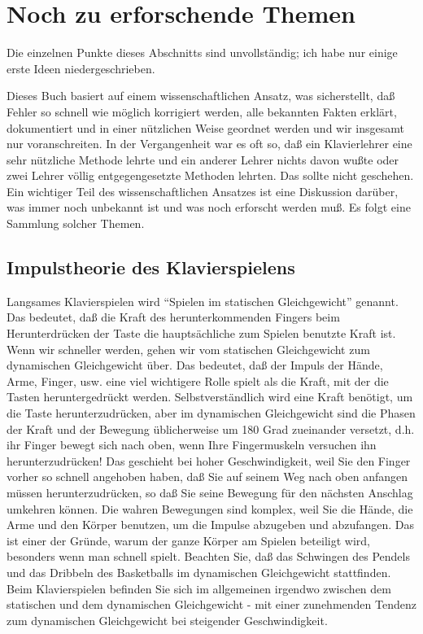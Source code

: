 
\section{Noch zu erforschende Themen}\hypertarget{c1iv6}{}

Die einzelnen Punkte dieses Abschnitts sind unvollständig; ich habe nur einige erste Ideen niedergeschrieben.

Dieses Buch basiert auf einem wissenschaftlichen Ansatz, was sicherstellt, daß Fehler so schnell wie möglich korrigiert werden, alle bekannten Fakten erklärt, dokumentiert und in einer nützlichen Weise geordnet werden und wir insgesamt nur voranschreiten.
In der Vergangenheit war es oft so, daß ein Klavierlehrer eine sehr nützliche Methode lehrte und ein anderer Lehrer nichts davon wußte oder zwei Lehrer völlig entgegengesetzte Methoden lehrten.
Das sollte nicht geschehen.
Ein wichtiger Teil des wissenschaftlichen Ansatzes ist eine Diskussion darüber, was immer noch unbekannt ist und was noch erforscht werden muß.
Es folgt eine Sammlung solcher Themen.


\subsection{Impulstheorie des Klavierspielens}\hypertarget{c1iv6a}{}

Langsames Klavierspielen wird \enquote{Spielen im statischen Gleichgewicht} genannt.
Das bedeutet, daß die Kraft des herunterkommenden Fingers beim Herunterdrücken der Taste die hauptsächliche zum Spielen benutzte Kraft ist.
Wenn wir schneller werden, gehen wir vom statischen Gleichgewicht zum dynamischen Gleichgewicht über.
Das bedeutet, daß der Impuls der Hände, Arme, Finger, usw. eine viel wichtigere Rolle spielt als die Kraft, mit der die Tasten heruntergedrückt werden.
Selbstverständlich wird eine Kraft benötigt, um die Taste herunterzudrücken, aber im dynamischen Gleichgewicht sind die Phasen der Kraft und der Bewegung üblicherweise um 180  Grad zueinander versetzt, d.h. ihr Finger bewegt sich nach oben, wenn Ihre Fingermuskeln versuchen ihn herunterzudrücken!
Das geschieht bei hoher Geschwindigkeit, weil Sie den Finger vorher so schnell angehoben haben, daß Sie auf seinem Weg nach oben anfangen müssen herunterzudrücken, so daß Sie seine Bewegung für den nächsten Anschlag umkehren können.
Die wahren Bewegungen sind komplex, weil Sie die Hände, die Arme und den Körper benutzen, um die Impulse abzugeben und abzufangen.
Das ist einer der Gründe, warum der ganze Körper am Spielen beteiligt wird, besonders wenn man schnell spielt.
Beachten Sie, daß das Schwingen des Pendels und das Dribbeln des Basketballs im dynamischen Gleichgewicht stattfinden.
Beim Klavierspielen befinden Sie sich im allgemeinen irgendwo zwischen dem statischen und dem dynamischen Gleichgewicht - mit einer zunehmenden Tendenz zum dynamischen Gleichgewicht bei steigender Geschwindigkeit.


